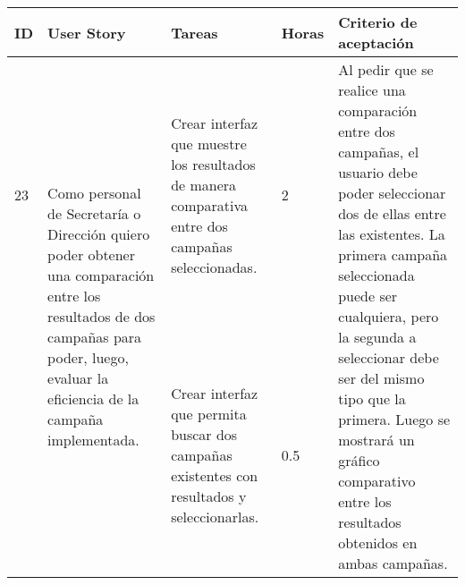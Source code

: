 \documentclass[a4paper, 11pt]{article}
\begin{document}
\begin{table}[H]
\centering
\begin{tabular}{ | p{0.5cm} | p{4cm} | p{5cm} | p{0.85cm} | p{5cm} |}
\hline 
ID & User Story & Tareas & Horas & Criterio de aceptación \\ \hline \hline

23 & \multirow{2}{4cm}{Como personal de Secretaría o Dirección quiero poder obtener una comparación entre los resultados de dos campañas para poder, luego, evaluar la eficiencia de la campaña implementada.} & Crear interfaz que muestre los resultados de manera comparativa entre dos campañas seleccionadas. & 2 & \multirow{2}{5cm}{Al pedir que se realice una comparación entre dos campañas, el usuario debe poder seleccionar dos de ellas entre las existentes. La primera campaña seleccionada puede ser cualquiera, pero la segunda a seleccionar debe ser del mismo tipo que la primera. Luego se mostrará un gráfico comparativo entre los resultados obtenidos en ambas campañas. } \\[3cm] \cline{3-4}
& & Crear interfaz que permita buscar dos campañas existentes con resultados y seleccionarlas. & 0.5 & \\[3cm] \hline

\end{tabular}
\end{table}

\section{}


\section{}
\end{document}

